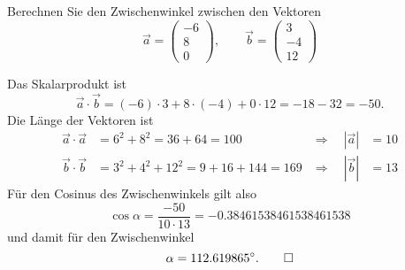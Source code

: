 Berechnen Sie den Zwischenwinkel zwischen den Vektoren
\[
\vec a
=
\begin{pmatrix}-6\\8\\0\end{pmatrix}
,\qquad
\vec b
=
\begin{pmatrix}3\\-4\\12\end{pmatrix}
\]


\begin{loesung}
Das Skalarprodukt ist
\[
\vec a\cdot\vec b=(-6)\cdot 3+8\cdot(-4)+0\cdot 12=-18-32=-50.
\]
Die Länge der Vektoren ist
\begin{align*}
\vec a\cdot\vec a&=6^2+8^2=36+64=100&\Rightarrow\quad|\vec a|&=10\\
\vec b\cdot\vec b&=3^2+4^2+12^2=9+16+144=169&\Rightarrow\quad|\vec b|&=13
\end{align*}
Für den Cosinus des Zwischenwinkels gilt also
\[
\cos \alpha=\frac{-50}{10\cdot 13}=-0.38461538461538461538
\]
und damit für den Zwischenwinkel
\[
\alpha=112.619865^\circ.
\qedhere
\]
\end{loesung}

